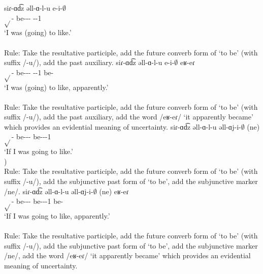 \begin{exe}
\begin{xlist}
		\ex \gll siɾ-ɑd͡z əll-ɑ-l-u e-i-$\emptyset$ \\
		$\sqrt{}$-{\rptcp} be-{\thgloss}-{\infgloss}-{\futcvb} {\aux}-{\pst}-1{\sg} \\
		\trans `I was (going) to like.' \\
		 \\
		Rule: Take the resultative participle, add the future converb form of `to be' (with suffix /-u/), add the past auxiliary. 
		\ex \gll siɾ-ɑd͡z əll-ɑ-l-u e-i-$\emptyset$ eʁ-eɾ \\
		$\sqrt{}$-{\rptcp} be-{\thgloss}-{\infgloss}-{\futcvb} {\aux}-{\pst}-1{\sg} be-{\eptcp} \\
		\trans `I was (going) to like, apparently.' \\
		 \\
		Rule: Take the resultative participle, add the future converb form of `to be' (with suffix /-u/), add the past auxiliary, add the word /eʁ-eɾ/ `it apparently became' which provides an evidential meaning of uncertainty. 
		\ex \gll siɾ-ɑd͡z əll-ɑ-l-u əll-ɑj-i-$\emptyset$ (ne) \\
		$\sqrt{}$-{\rptcp} be-{\thgloss}-{\infgloss}-{\futcvb} be-{\thgloss}-{\pst}-1{\sg} {\sbjv} \\
		\trans `If I was going to like.' \\
		) \\
		Rule: Take the resultative participle, add the future converb form of `to be' (with suffix /-u/), add the subjunctive past form of `to be', add the subjunctive marker /ne/. 
		\ex \gll siɾ-ɑd͡z əll-ɑ-l-u əll-ɑj-i-$\emptyset$ (ne) eʁ-eɾ \\
		$\sqrt{}$-{\rptcp} be-{\thgloss}-{\infgloss}-{\futcvb} be-{\thgloss}-{\pst}-1{\sg} {\sbjv} be-{\eptcp} \\
		\trans `If I was going to like, apparently.' \\
		 \\ 
		Rule: Take the resultative participle, add the future converb form of `to be' (with suffix /-u/), add the subjunctive past form of `to be', add the subjunctive marker /ne/, add the word /eʁ-eɾ/ `it apparently became' which provides an evidential meaning of uncertainty. 
		
	\end{xlist}
\end{exe}




